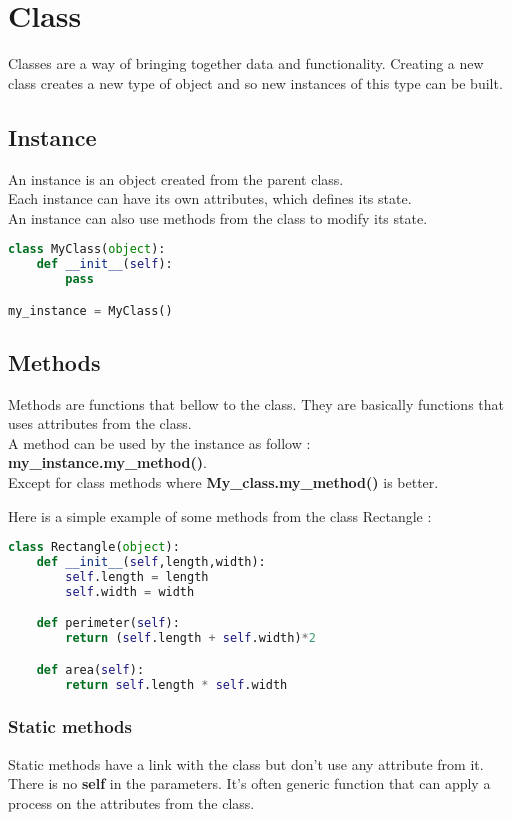 \documentclass[a4paper, 12pt, titlepage]{scrartcl} %
\begin{document}
\newpage
\section{Class}
\label{sec:Class}
Classes are a way of bringing together data and functionality. Creating a new class creates a new type of object and so new instances of this type can be built.

\subsection{Instance}
An instance is an object created from the parent class. \\
Each instance can have its own attributes, which defines its state. \\
An instance can also use methods from the class to modify its state.
\begin{lstlisting}[language=Python]
class MyClass(object):
	def __init__(self):
		pass

my_instance = MyClass()
\end{lstlisting} \vspace{5mm}

\subsection{Methods}
Methods are functions that bellow to the class. They are basically functions that uses attributes from the class. \\
A method can be used by the instance as follow : \textbf{my\_instance.my\_method()}. \\
Except for class methods where \textbf{My\_class.my\_method()} is better.

\vspace{5mm}

Here is a simple example of some methods from the class Rectangle : 
\begin{lstlisting}[language=Python]
class Rectangle(object):
	def __init__(self,length,width):
		self.length = length
		self.width = width

	def perimeter(self):
		return (self.length + self.width)*2

	def area(self):
		return self.length * self.width
\end{lstlisting} \vspace{5mm}

\subsubsection{Static methods}
Static methods have a link with the class but don't use any attribute from it. There is no \textbf{self} in the parameters. It's often generic function that can apply a process on the attributes from the class.
\end{document}
